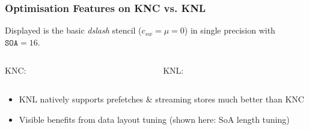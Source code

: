 \documentclass{beamer}
\begin{document}
  \begin{frame}
    \frametitle{Optimisation Features on KNC vs. KNL}
    \footnotesize

    {\tiny
    Displayed is the basic \textit{dslash} stencil ($c_{sw}=\mu=0$) in single precision
    with $\texttt{SOA}=16$.}

    \begin{columns}[T]
      \begin{column}{.5\textwidth}
        \begin{center}
          KNC:\\
          \vfill
        \end{center}
      \end{column}
      \begin{column}{.5\textwidth}
        \begin{center}
          KNL:\\
          \vfill
        \end{center}
      \end{column}
    \end{columns}

    \begin{itemize}
      \item KNL natively supports prefetches \& streaming stores much better than KNC
        \vfill
      \item Visible benefits from data layout tuning (shown here: SoA length tuning)
        \vfill
    \end{itemize}

  \end{frame}

\end{document}
